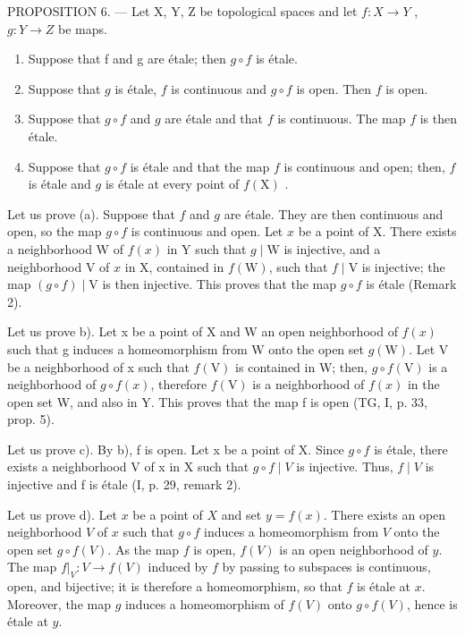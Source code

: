 PROPOSITION 6. — Let X, Y, Z be topological spaces and let \(f\colon X\to Y\) , \(g\colon Y\to Z\) be maps.

\begin{enumerate}
\def\labelenumi{\alph{enumi})}
\item
  Suppose that f and g are étale; then \(g \circ f\) is étale.
\item
  Suppose that \(g\) is étale, \(f\) is continuous and \(g \circ f\) is open. Then \(f\) is open.
\item
  Suppose that \(g \circ f\) and \(g\) are étale and that \(f\) is continuous. The map \(f\) is then étale.
\item
  Suppose that \(g \circ f\) is étale and that the map \(f\) is continuous and open; then, \(f\) is étale and \(g\) is étale at every point of \(f(\mathrm{X})\) .
\end{enumerate}

Let us prove (a). Suppose that \(f\) and \(g\) are étale. They are then continuous and open, so the map \(g \circ f\) is continuous and open. Let \(x\) be a point of X. There exists a neighborhood W of \(f(x)\) in Y such that \(g \mid \mathrm{W}\) is injective, and a neighborhood V of \(x\) in X, contained in \(f(\mathrm{W})\), such that \(f \mid \mathrm{V}\) is injective; the map \((g \circ f) \mid \mathrm{V}\) is then injective. This proves that the map \(g \circ f\) is étale (Remark 2).

Let us prove b). Let x be a point of X and W an open neighborhood of \(f(x)\) such that g induces a homeomorphism from W onto the open set \(g(\mathrm{W})\). Let V be a neighborhood of x such that \(f(\mathrm{V})\) is contained in W; then, \(g \circ f(\mathrm{V})\) is a neighborhood of \(g \circ f(x)\), therefore \(f(\mathrm{V})\) is a neighborhood of \(f(x)\) in the open set W, and also in Y. This proves that the map f is open (TG, I, p. 33, prop. 5).

Let us prove c). By b), f is open. Let x be a point of X. Since \(g \circ f\) is étale, there exists a neighborhood V of x in X such that \(g \circ f \mid V\) is injective. Thus, \(f \mid V\) is injective and f is étale (I, p. 29, remark 2).

Let us prove d). Let \(x\) be a point of \(X\) and set \(y = f(x)\). There exists an open neighborhood \(V\) of \(x\) such that \(g \circ f\) induces a homeomorphism from \(V\) onto the open set \(g \circ f(V)\). As the map \(f\) is open, \(f(V)\) is an open neighborhood of \(y\). The map \(f|_V\colon V \to f(V)\) induced by \(f\) by passing to subspaces is continuous, open, and bijective; it is therefore a homeomorphism, so that \(f\) is étale at \(x\). Moreover, the map \(g\) induces a homeomorphism of \(f(V)\) onto \(g \circ f(V)\), hence is étale at \(y\).

